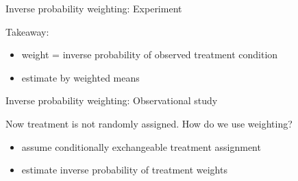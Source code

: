 \documentclass{beamer}
\renewcommand\P{\text{P}}
\begin{document}

\begin{frame}{Inverse probability weighting: Experiment}

Takeaway:
\begin{itemize}
\item weight = inverse probability of observed treatment condition
\item estimate by weighted means
\end{itemize}

\end{frame}


\begin{frame}{Inverse probability weighting: Observational study}

Now treatment is not randomly assigned. How do we use weighting? \pause
\begin{itemize}
\item assume conditionally exchangeable treatment assignment
\item estimate inverse probability of treatment weights
\end{itemize}

\end{frame}
\end{document}

